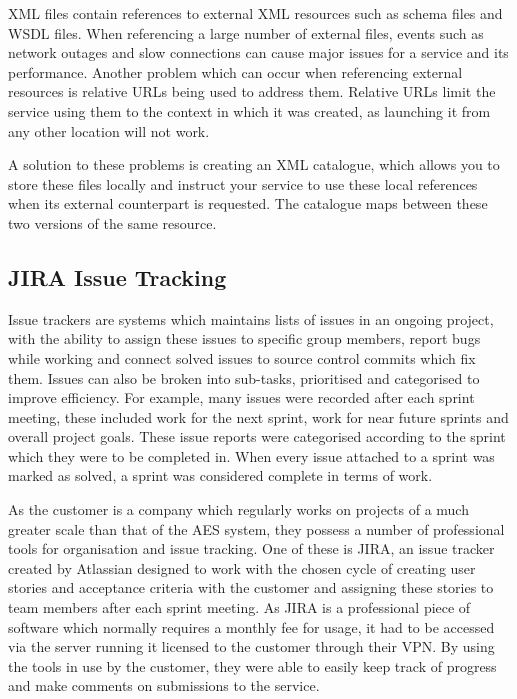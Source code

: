 \documentclass[a4paper, 12pt, twoside]{article}
\begin{document}
XML files contain references to external XML resources such as schema files and WSDL files. When referencing a large number of external files, events such as network outages and slow connections can cause major issues for a service and its performance. Another problem which can occur when referencing external resources is relative URLs being used to address them. Relative URLs limit the service using them to the context in which it was created, as launching it from any other location will not work.

A solution to these problems is creating an XML catalogue, which allows you to store these files locally and instruct your service to use these local references when its external counterpart is requested. The catalogue maps between these two versions of the same resource.

\subsection{JIRA Issue Tracking}
\label{sec:bg_jira}

Issue trackers are systems which maintains lists of issues in an ongoing project, with the ability to assign these issues to specific group members, report bugs while working and connect solved issues to source control commits which fix them. Issues can also be broken into sub-tasks, prioritised and categorised to improve efficiency. For example, many issues were recorded after each sprint meeting, these included work for the next sprint, work for near future sprints and overall project goals. These issue reports were categorised according to the sprint which they were to be completed in. When every issue attached to a sprint was marked as solved, a sprint was considered complete in terms of work.

As the customer is a company which regularly works on projects of a much greater scale than that of the AES system, they possess a number of professional tools for organisation and issue tracking. One of these is JIRA, an issue tracker created by Atlassian designed to work with the chosen cycle of creating user stories and acceptance criteria with the customer and assigning these stories to team members after each sprint meeting. As JIRA is a professional piece of software which normally requires a monthly fee for usage, it had to be accessed via the server running it licensed to the customer through their VPN. By using the tools in use by the customer, they were able to easily keep track of progress and make comments on submissions to the service.
\end{document}
